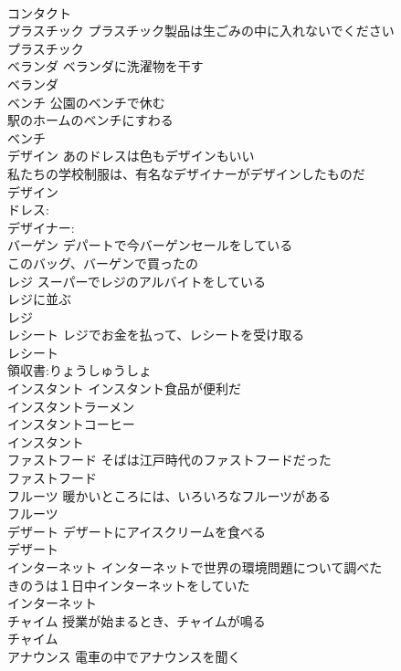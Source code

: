 \documentclass[8pt]{extreport}
\begin{document}
\begin{CJK}{UTF8}{min}
\\	コンタクト			
\\	プラスチック	プラスチック製品は生ごみの中に入れないでください 
\\	プラスチック			
\\	ベランダ	ベランダに洗濯物を干す 
\\	ベランダ			
\\	ベンチ	公園のベンチで休む 
\\	駅のホームのベンチにすわる 
\\	ベンチ			
\\	デザイン	あのドレスは色もデザインもいい 
\\	私たちの学校制服は、有名なデザイナーがデザインしたものだ 
\\	デザイン			
\\	ドレス:
\\	デザイナー: 
\\	バーゲン	デパートで今バーゲンセールをしている 
\\	このバッグ、バーゲンで買ったの 
\\	レジ	スーパーでレジのアルバイトをしている 
\\	レジに並ぶ 
\\	レジ			
\\	レシート	レジでお金を払って、レシートを受け取る 
\\	レシート			
\\	領収書:りょうしゅうしょ
\\	インスタント	インスタント食品が便利だ 
\\	インスタントラーメン 
\\	インスタントコーヒー 
\\	インスタント			
\\	ファストフード	そばは江戸時代のファストフードだった 
\\	ファストフード			
\\	フルーツ	暖かいところには、いろいろなフルーツがある 
\\	フルーツ			
\\	デザート	デザートにアイスクリームを食べる 
\\	デザート			
\\	インターネット	インターネットで世界の環境問題について調べた 
\\	きのうは１日中インターネットをしていた 
\\	インターネット						
\\	チャイム	授業が始まるとき、チャイムが鳴る 
\\	チャイム			
\\	アナウンス	電車の中でアナウンスを聞く 

\end{CJK}
\end{document}
